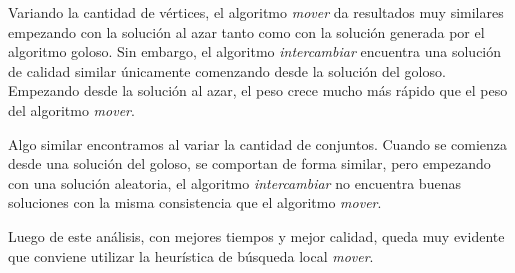 Variando la cantidad de vértices, el algoritmo \textit{mover} da resultados muy
similares empezando con la solución al azar tanto como con la solución generada
por el algoritmo goloso. Sin embargo, el algoritmo \textit{intercambiar}
encuentra una solución de calidad similar únicamente comenzando desde la
solución del goloso. Empezando desde la solución al azar, el peso crece mucho
más rápido que el peso del algoritmo \textit{mover}.

\vspace{0.25cm}

Algo similar encontramos al variar la cantidad de conjuntos. Cuando se comienza
desde una solución del goloso, se comportan de forma similar, pero empezando
con una solución aleatoria, el algoritmo \textit{intercambiar} no encuentra
buenas soluciones con la misma consistencia que el algoritmo \textit{mover}.

Luego de este análisis, con mejores tiempos y mejor calidad, queda muy evidente
que conviene utilizar la heurística de búsqueda local \textit{mover}.
